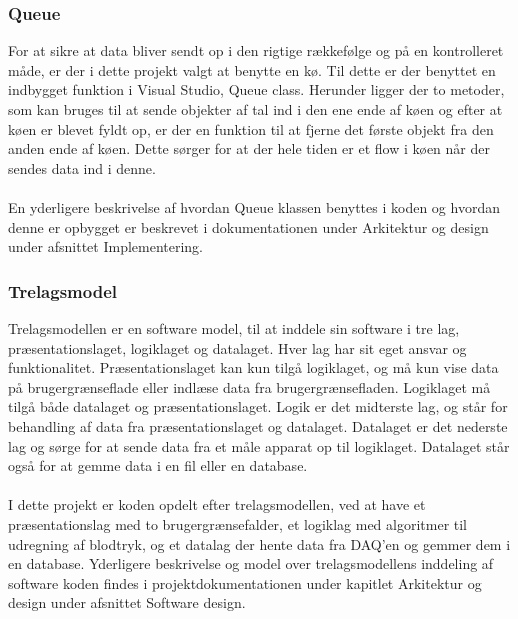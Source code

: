 \subsubsection{Queue}
For at sikre at data bliver sendt op i den rigtige rækkefølge og på en kontrolleret måde, er der i dette projekt valgt at benytte en kø. Til dette er der benyttet en indbygget funktion i Visual Studio, Queue class. Herunder ligger der to metoder, som kan bruges til at sende objekter af tal ind i den ene ende af køen og efter at køen er blevet fyldt op, er der en funktion til at fjerne det første objekt fra den anden ende af køen. Dette sørger for at der hele tiden er et flow i køen når der sendes data ind i denne. \\
\\
En yderligere beskrivelse af hvordan Queue klassen benyttes i koden og hvordan denne er opbygget er beskrevet i dokumentationen under Arkitektur og design under afsnittet Implementering.
\subsubsection{Trelagsmodel}
Trelagsmodellen er en software model, til at inddele sin software i tre lag, præsentationslaget, logiklaget og datalaget. Hver lag har sit eget ansvar og funktionalitet. Præsentationslaget kan kun tilgå logiklaget, og må kun vise data på brugergrænseflade eller indlæse data fra brugergrænsefladen. Logiklaget må tilgå både datalaget og præsentationslaget. Logik er det midterste lag, og står for behandling af data fra præsentationslaget og datalaget. Datalaget er det nederste lag og sørge for at sende data fra et måle apparat op til logiklaget. Datalaget står også for at gemme data i en fil eller en database.\\
\\ 
I dette projekt er koden opdelt efter trelagsmodellen, ved at have et præsentationslag med to brugergrænsefalder, et logiklag med algoritmer til udregning af blodtryk, og et datalag der hente data fra DAQ’en og gemmer dem i en database.  Yderligere beskrivelse og model over trelagsmodellens inddeling af software koden findes i projektdokumentationen under kapitlet Arkitektur og design under afsnittet Software design.
